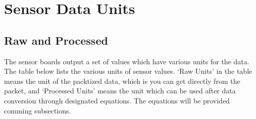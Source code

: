 \newpage
\section{Sensor Data Units}\label{section:parameterUnits}
\subsection { Raw and Processed} 


The sensor boards output a set of values which have various units for the data.
The table below lists the various units of sensor values.
`Raw Units' in the table means the unit of the packtized data, which is you can get directly from the packet, and `Processed Units' means the unit which can be used after data conversion through designated equations.
The equations will be provided comming subsections.


